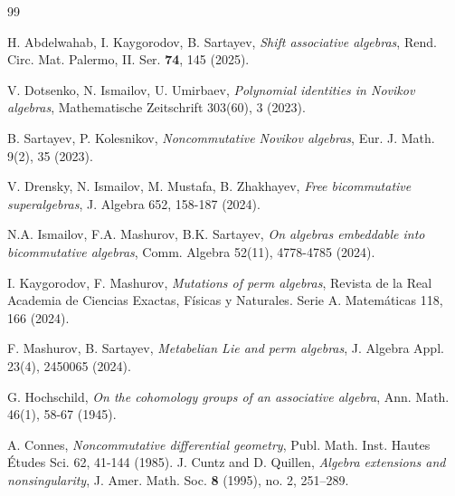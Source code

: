 \documentclass[pdflatex,sn-mathphys-num]{sn-jnl}%
\theoremstyle{thmstyleone}%
\theoremstyle{thmstyletwo}%
\theoremstyle{thmstylethree}%
\begin{document}
\begin{thebibliography}{99}

H. Abdelwahab, I. Kaygorodov, B. Sartayev, \textit{Shift associative algebras}, 
Rend. Circ. Mat. Palermo, II. Ser. \textbf{74}, 145 (2025).


V. Dotsenko, N. Ismailov, U. Umirbaev, \textit{Polynomial identities in Novikov algebras}, Mathematische Zeitschrift 303(60), 3 (2023).

B. Sartayev, P. Kolesnikov, \textit{Noncommutative Novikov algebras}, Eur. J. Math. 9(2), 35 (2023).

V. Drensky, N. Ismailov, M. Mustafa, B. Zhakhayev, \textit{Free bicommutative superalgebras}, J. Algebra 652, 158-187 (2024).

N.A. Ismailov, F.A. Mashurov, B.K. Sartayev, \textit{On algebras embeddable into bicommutative algebras}, Comm. Algebra 52(11), 4778-4785 (2024).

I. Kaygorodov, F. Mashurov, \textit{Mutations of perm algebras}, Revista de la Real Academia de Ciencias Exactas, Físicas y Naturales. Serie A. Matemáticas 118, 166 (2024).

F. Mashurov, B. Sartayev, \textit{Metabelian Lie and perm algebras}, J. Algebra Appl. 23(4), 2450065 (2024).

G. Hochschild, \textit{On the cohomology groups of an associative algebra}, Ann. Math. 46(1), 58-67 (1945).

A. Connes, \textit{Noncommutative differential geometry}, Publ. Math. Inst. Hautes Études Sci. 62, 41-144 (1985).
J. Cuntz and D. Quillen, \textit{Algebra extensions and nonsingularity}, 
J. Amer. Math. Soc. \textbf{8} (1995), no. 2, 251--289.
\end{thebibliography}

\end{document}
